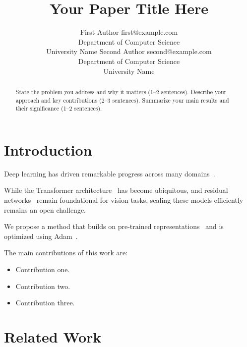 \documentclass[10pt]{article} %
\title{Your Paper Title Here}
\author{\name First Author \email first@example.com \\
      \addr Department of Computer Science\\
      University Name
      \AND
      \name Second Author \email second@example.com \\
      \addr Department of Computer Science\\
      University Name}
\theoremstyle{definition}
\theoremstyle{remark}
\begin{document}
\maketitle

\begin{abstract}
State the problem you address and why it matters (1--2 sentences).
Describe your approach and key contributions (2--3 sentences).
Summarize your main results and their significance (1--2 sentences).
\end{abstract}

\section{Introduction}
\label{sec:intro}

Deep learning has driven remarkable progress across many domains~\citep{lecun2015deep, goodfellow2016deep}.

While the Transformer architecture~\citep{vaswani2017attention} has become ubiquitous,
and residual networks~\citep{he2016deep} remain foundational for vision tasks,
scaling these models efficiently remains an open challenge.

We propose a method that builds on pre-trained representations~\citep{devlin2019bert}
and is optimized using Adam~\citep{kingma2014adam}.

The main contributions of this work are:
\begin{itemize}[leftmargin=*, itemsep=2pt]
    \item Contribution one.
    \item Contribution two.
    \item Contribution three.
\end{itemize}

\section{Related Work}
\label{sec:related}
\end{document}
